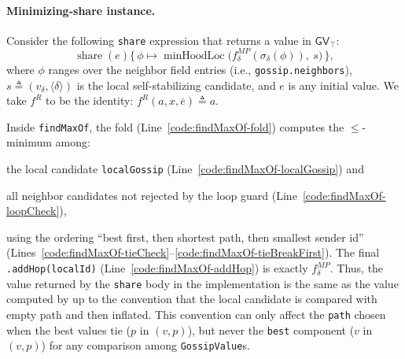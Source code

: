 \documentclass[runningheads]{llncs}
\newcommand{\seq}[1]{\langle #1 \rangle}      %
\newenvironment{inlinelist}{\begin{enumerate*}[label=\emph{(\roman*)}]}{\end{enumerate*}}
\begin{document}
\paragraph{Minimizing-share instance.}

Consider the following \lstinline|share| expression that returns a value in $\mathsf{GV}_\top$:
\begin{equation}
    \label{eq:gv-minshare}
    \operatorname{share}(e)\{\,\phi \mapsto
    \operatorname{minHoodLoc}\big(
    f^{MP}_\delta(\sigma_\delta(\phi)),\ s
    \big)
    \,\},
\end{equation}
where $\phi$ ranges over the neighbor field entries (i.e., \lstinline|gossip.neighbors|),
$s \triangleq (v_\delta,\seq{\delta})$ is the local self-stabilizing candidate,
and $e$ is any initial value.
%
We take $f^{R}$ to be the identity: $f^{R}(a,x,\bar e)\triangleq a$.

Inside \lstinline|findMaxOf|, the fold (Line~\ref{code:findMaxOf-fold}) computes the $\le$-minimum among:
\begin{inlinelist}
    \item the local candidate \lstinline|localGossip| (Line~\ref{code:findMaxOf-localGossip}) and
    \item all neighbor candidates not rejected by the loop guard (Line~\ref{code:findMaxOf-loopCheck}),
\end{inlinelist}
using the ordering ``best first, then shortest path, then smallest sender id'' (Lines~\ref{code:findMaxOf-tieCheck}--\ref{code:findMaxOf-tieBreakFirst}).
The final \lstinline|.addHop(localId)| (Line~\ref{code:findMaxOf-addHop}) is exactly $f^{MP}_\delta$.
Thus, the value returned by the \lstinline|share| body in the implementation is the same as the value computed by 
up to the convention that the local candidate is compared with empty path and then inflated.
%
This convention can only affect the \lstinline|path| chosen when the best values tie
($p$ in $(v, p)$),
but never the \lstinline|best| component ($v$ in $(v, p)$) for any comparison among \lstinline|GossipValue|s.
\end{document}
